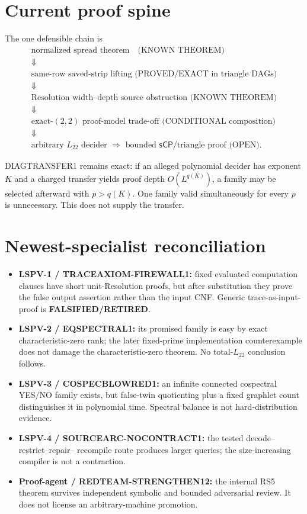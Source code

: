 \documentclass[11pt]{article}
\newcommand{\Ltw}{L_{22}}
\newcommand{\sCP}{\mathsf{sCP}}
\newcommand{\RET}{\textbf{FALSIFIED/RETIRED}}
\begin{document}
\section{Current proof spine}
The one defensible chain is
\[
\boxed{
\begin{array}{c}
\text{normalized spread theorem}\quad\text{(KNOWN THEOREM)}\\
\Downarrow\\
\text{same-row saved-strip lifting (PROVED/EXACT in triangle DAGs)}\\
\Downarrow\\
\text{Resolution width--depth source obstruction (KNOWN THEOREM)}\\
\Downarrow\\
\text{exact-}(2,2)\text{ proof-model trade-off (CONDITIONAL composition)}\\
\Downarrow\\
\text{arbitrary }\Ltw\text{ decider }\Rightarrow\text{ bounded }\sCP
\text{/triangle proof (OPEN).}
\end{array}}
\]

DIAGTRANSFER1 remains exact: if an alleged polynomial decider has exponent $K$ and a
charged transfer yields proof depth $O(L^{q(K)})$, a family may be selected afterward
with $p>q(K)$.  One family valid simultaneously for every $p$ is unnecessary.  This
does not supply the transfer.

\section{Newest-specialist reconciliation}
\begin{itemize}
\item \textbf{LSPV-1 / TRACEAXIOM-FIREWALL1:} fixed evaluated computation clauses have
short unit-Resolution proofs, but after substitution they prove the false output
assertion rather than the input CNF.  Generic trace-as-input-proof is \RET{}.
\item \textbf{LSPV-2 / EQSPECTRAL1:} its promised family is easy by exact
characteristic-zero rank; the later fixed-prime implementation counterexample does not
damage the characteristic-zero theorem.  No total-$\Ltw$ conclusion follows.
\item \textbf{LSPV-3 / COSPECBLOWRED1:} an infinite connected cospectral YES/NO family
exists, but false-twin quotienting plus a fixed graphlet count distinguishes it in
polynomial time.  Spectral balance is not hard-distribution evidence.
\item \textbf{LSPV-4 / SOURCEARC-NOCONTRACT1:} the tested decode--restrict--repair--
recompile route produces larger queries; the size-increasing compiler is not a
contraction.
\item \textbf{Proof-agent / REDTEAM-STRENGTHEN12:} the internal RS5 theorem survives
independent symbolic and bounded adversarial review.  It does not license an
arbitrary-machine promotion.
\end{itemize}
\end{document}
